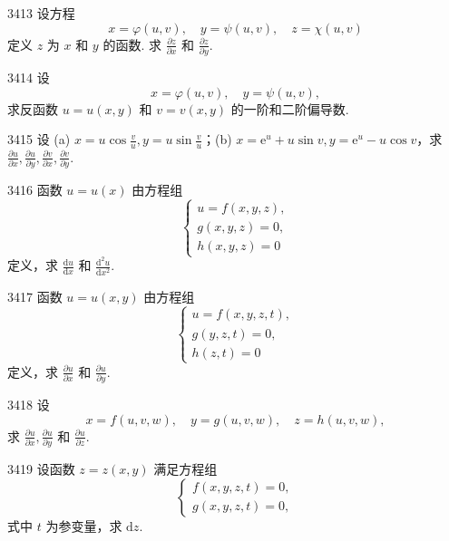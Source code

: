 \begin{prob}[M]{3413}
设方程
\[
x = \varphi(u, v), \quad y = \psi(u, v), \quad z = \chi(u, v)
\]
定义 $z$ 为 $x$ 和 $y$ 的函数. 求 $\frac{\partial z}{\partial x}$ 和 $\frac{\partial z}{\partial y}$.
\end{prob}

\begin{prob}[M]{3414}
设
\[
x = \varphi(u, v), \quad y = \psi(u, v),
\]
求反函数 $u = u(x, y)$ 和 $v = v(x, y)$ 的一阶和二阶偏导数.
\end{prob}

\begin{prob}[M]{3415}
设 (a) $x = u\cos\frac{v}{u}, y = u\sin\frac{v}{u}$；\qquad (b) $x = \mathrm{e}^u + u\sin v, y = \mathrm{e}^u - u\cos v$，求 $\frac{\partial u}{\partial x}, \frac{\partial u}{\partial y}, \frac{\partial v}{\partial x}, \frac{\partial v}{\partial y}$.
\end{prob}

\begin{prob}[M]{3416}
函数 $u = u(x)$ 由方程组
\[
\begin{cases}
u = f(x, y, z), \\
g(x, y, z) = 0, \\
h(x, y, z) = 0
\end{cases}
\]
定义，求 $\frac{\mathrm{d}u}{\mathrm{d}x}$ 和 $\frac{\mathrm{d}^2 u}{\mathrm{d}x^2}$.
\end{prob}

\begin{prob}[M]{3417}
函数 $u = u(x, y)$ 由方程组
\[
\begin{cases}
u = f(x, y, z, t), \\
g(y, z, t) = 0, \\
h(z, t) = 0
\end{cases}
\]
定义，求 $\frac{\partial u}{\partial x}$ 和 $\frac{\partial u}{\partial y}$.
\end{prob}

\begin{prob}[M]{3418}
设
\[
x = f(u, v, w), \quad y = g(u, v, w), \quad z = h(u, v, w),
\]
求 $\frac{\partial u}{\partial x}, \frac{\partial u}{\partial y}$ 和 $\frac{\partial u}{\partial z}$.
\end{prob}

\begin{prob}[M]{3419}
设函数 $z = z(x, y)$ 满足方程组
\[
\begin{cases}
f(x, y, z, t) = 0, \\
g(x, y, z, t) = 0,
\end{cases}
\]
式中 $t$ 为参变量，求 $\mathrm{d}z$.
\end{prob}

